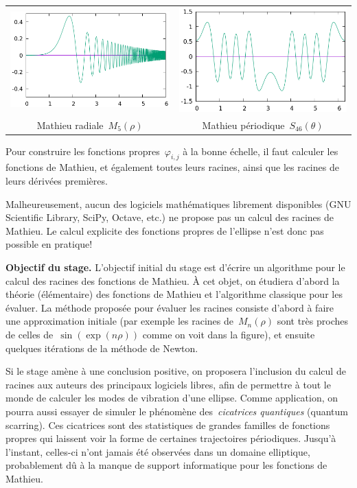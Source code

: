 \documentclass[a4paper,10pt]{article}
\begin{document}
\vspace{-1em}
\begin{center}
\begin{tabular}{cc}
	\includegraphics[width=0.3\linewidth]{f/mathieu_radial.png} &
	\includegraphics[width=0.3\linewidth]{f/mathieu_periodic.png} \\
	Mathieu radiale~$M_5(\rho)$ & Mathieu périodique~$S_{46}(\theta)$
\end{tabular}
\end{center}
\vspace{-1em}
Pour construire les fonctions propres~$\varphi_{i,j}$ à la bonne échelle, il
faut calculer les fonctions de Mathieu, et également toutes
leurs racines, ainsi que les racines de leurs dérivées premières.

Malheureusement, aucun des logiciels mathématiques librement disponibles (GNU
Scientific Library, SciPy, Octave, etc.) ne propose pas un calcul des racines
de Mathieu.  Le calcul explicite des fonctions propres de l'ellipse n'est donc
pas possible en pratique!

{\bf Objectif du stage.}
L'objectif initial du stage est d'écrire un algorithme pour le calcul des
racines des fonctions de Mathieu.  À cet objet, on étudiera d'abord la théorie
(élémentaire) des fonctions de Mathieu et l'algorithme classique pour les
évaluer.  La méthode proposée pour évaluer les racines consiste d'abord à faire
une approximation initiale (par exemple les racines de~$M_n(\rho)$ sont très
proches de celles de~$\sin(\exp(n\rho))$ comme on voit dans la figure), et
ensuite quelques itérations de la méthode de Newton.

Si le stage amène à une conclusion positive, on proposera l'inclusion du calcul
de racines aux auteurs des principaux logiciels libres, afin de permettre à
tout le monde de calculer les modes de vibration d'une ellipse.  Comme
application, on pourra aussi essayer de simuler le phénomène
des~\emph{cicatrices quantiques} (quantum scarring).  Ces
cicatrices sont des statistiques de grandes familles de fonctions propres qui
laissent voir la forme de certaines trajectoires périodiques.  Jusqu'à
l'instant, celles-ci n'ont jamais été observées dans un domaine elliptique,
probablement dû à la manque de support informatique pour les fonctions de
Mathieu.
\end{document}
